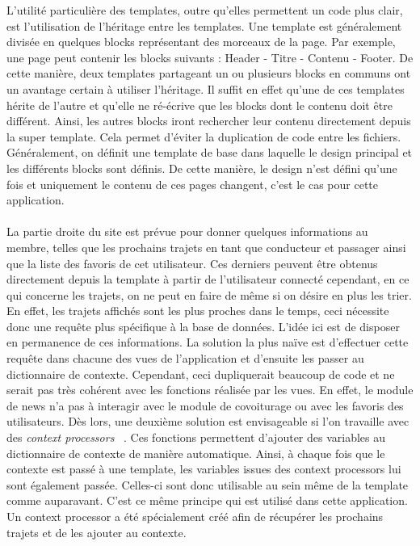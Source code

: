 \documentclass[12pt, a4paper, oneside]{article}
\begin{document}
{{    \indent L'utilité particulière des templates, outre qu'elles permettent un code plus clair, est l'utilisation de l'héritage entre les templates. Une template est généralement divisée en quelques blocks représentant des morceaux de la page. Par exemple, une page peut contenir les blocks suivants : Header - Titre - Contenu - Footer. De cette manière, deux templates partageant un ou plusieurs blocks en communs ont un avantage certain à utiliser l'héritage. Il suffit en effet qu'une de ces templates hérite de l'autre et qu'elle ne ré-écrive que les blocks dont le contenu doit être différent. Ainsi, les autres blocks iront rechercher leur contenu directement depuis la super template. Cela permet d'éviter la duplication de code entre les fichiers. Généralement, on définit une template de base dans laquelle le design principal et les différents blocks sont définis. De cette manière, le design n'est défini qu'une fois et uniquement le contenu de ces pages changent, c'est le cas pour cette application.\\\\
    \indent La partie droite du site est prévue pour donner quelques informations au membre, telles que les prochains trajets en tant que conducteur et passager ainsi que la liste des favoris de cet utilisateur. Ces derniers peuvent être obtenus directement depuis la template à partir de l'utilisateur connecté cependant, en ce qui concerne les trajets, on ne peut en faire de même si on désire en plus les trier. En effet, les trajets affichés sont les plus proches dans le temps, ceci nécessite donc une requête plus spécifique à la base de données. L'idée ici est de disposer en permanence de ces informations. La solution la plus naïve est d'effectuer cette requête dans chacune des vues de l'application et d'ensuite les passer au dictionnaire de contexte. Cependant, ceci dupliquerait beaucoup de code et ne serait pas très cohérent avec les fonctions réalisée par les vues. En effet, le module de news n'a pas à interagir avec le module de covoiturage ou avec les favoris des utilisateurs. Dès lors, une deuxième solution est envisageable si l'on travaille avec des \textit{context processors} ~\cite{django-context-processor}. Ces fonctions permettent d'ajouter des variables au dictionnaire de contexte de manière automatique. Ainsi, à chaque fois que le contexte est passé à une template, les variables issues des context processors lui sont également passée. Celles-ci sont donc utilisable au sein même de la template comme auparavant. C'est ce même principe qui est utilisé dans cette application. Un context processor a été spécialement créé afin de récupérer les prochains trajets et de les ajouter au contexte.
}}
\end{document}
